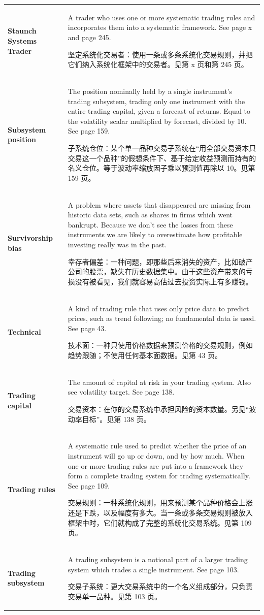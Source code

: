 \begin{chinesetableblock}
{\begin{longtable}{@{}>{\raggedright\arraybackslash\bfseries} p{}>{\raggedright\arraybackslash} p{}@{}}
Staunch Systems Trader & A trader who uses one or more systematic trading rules and incorporates them into a systematic framework. See page x and page 245. \par 坚定系统化交易者：使用一条或多条系统化交易规则，并把它们纳入系统化框架中的交易者。见第 x 页和第 245 页。 \\[0.65em]
Subsystem position & The position nominally held by a single instrument’s trading subsystem, trading only one instrument with the entire trading capital, given a forecast of returns. Equal to the volatility scalar multiplied by forecast, divided by 10. See page 159. \par 子系统仓位：某个单一品种交易子系统在“用全部交易资本只交易这一个品种”的假想条件下、基于给定收益预测而持有的名义仓位。等于波动率缩放因子乘以预测值再除以 10。见第 159 页。 \\[0.65em]
Survivorship bias & A problem where assets that disappeared are missing from historic data sets, such as shares in firms which went bankrupt. Because we don’t see the losses from these instruments we are likely to overestimate how profitable investing really was in the past. \par 幸存者偏差：一种问题，即那些后来消失的资产，比如破产公司的股票，缺失在历史数据集中。由于这些资产带来的亏损没有被看见，我们就容易高估过去投资实际上有多赚钱。 \\[0.65em]
Technical & A kind of trading rule that uses only price data to predict prices, such as trend following; no fundamental data is used. See page 43. \par 技术面：一种只使用价格数据来预测价格的交易规则，例如趋势跟随；不使用任何基本面数据。见第 43 页。 \\[0.65em]
Trading capital & The amount of capital at risk in your trading system. Also see volatility target. See page 138. \par 交易资本：在你的交易系统中承担风险的资本数量。另见“波动率目标”。见第 138 页。 \\[0.65em]
Trading rules & A systematic rule used to predict whether the price of an instrument will go up or down, and by how much. When one or more trading rules are put into a framework they form a complete trading system for trading systematically. See page 109. \par 交易规则：一种系统化规则，用来预测某个品种价格会上涨还是下跌，以及幅度有多大。当一条或多条交易规则被放入框架中时，它们就构成了完整的系统化交易系统。见第 109 页。 \\[0.65em]
Trading subsystem & A trading subsystem is a notional part of a larger trading system which trades a single instrument. See page 103. \par 交易子系统：更大交易系统中的一个名义组成部分，只负责交易单一品种。见第 103 页。 \\[0.65em]

\end{longtable}}
\end{chinesetableblock}
